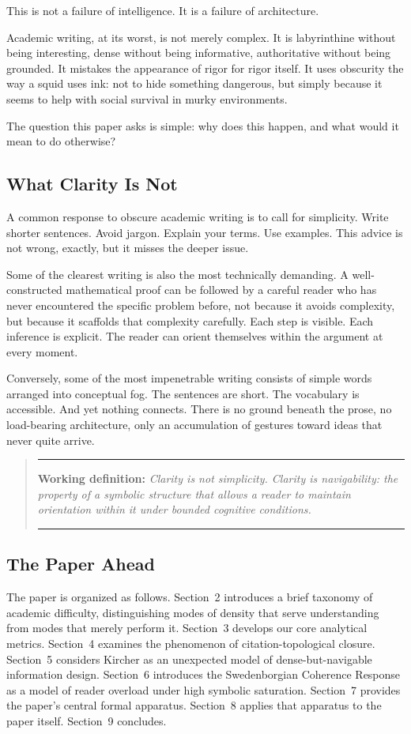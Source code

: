 \documentclass[12pt, a4paper]{article}
\newenvironment{claritybox}
  {\begin{quote}\small\color{fogblue}\rule{\linewidth}{0.6pt}\par\smallskip}
  {\par\smallskip\rule{\linewidth}{0.4pt}\end{quote}}
\begin{document}
This is not a failure of intelligence. It is a failure of architecture.

Academic writing, at its worst, is not merely complex. It is labyrinthine without being interesting, dense without being informative, authoritative without being grounded. It mistakes the appearance of rigor for rigor itself. It uses obscurity the way a squid uses ink: not to hide something dangerous, but simply because it seems to help with social survival in murky environments.

The question this paper asks is simple: why does this happen, and what would it mean to do otherwise?

\subsection{What Clarity Is Not}

A common response to obscure academic writing is to call for simplicity. Write shorter sentences. Avoid jargon. Explain your terms. Use examples. This advice is not wrong, exactly, but it misses the deeper issue.

Some of the clearest writing is also the most technically demanding. A well-constructed mathematical proof can be followed by a careful reader who has never encountered the specific problem before, not because it avoids complexity, but because it scaffolds that complexity carefully. Each step is visible. Each inference is explicit. The reader can orient themselves within the argument at every moment.

Conversely, some of the most impenetrable writing consists of simple words arranged into conceptual fog. The sentences are short. The vocabulary is accessible. And yet nothing connects. There is no ground beneath the prose, no load-bearing architecture, only an accumulation of gestures toward ideas that never quite arrive.

\begin{claritybox}
\textbf{Working definition:} \textit{Clarity is not simplicity. Clarity is navigability: the property of a symbolic structure that allows a reader to maintain orientation within it under bounded cognitive conditions.}
\end{claritybox}

\subsection{The Paper Ahead}

The paper is organized as follows. Section~2 introduces a brief taxonomy of academic difficulty, distinguishing modes of density that serve understanding from modes that merely perform it. Section~3 develops our core analytical metrics. Section~4 examines the phenomenon of citation-topological closure. Section~5 considers Kircher as an unexpected model of dense-but-navigable information design. Section~6 introduces the Swedenborgian Coherence Response as a model of reader overload under high symbolic saturation. Section~7 provides the paper's central formal apparatus. Section~8 applies that apparatus to the paper itself. Section~9 concludes.
\end{document}
